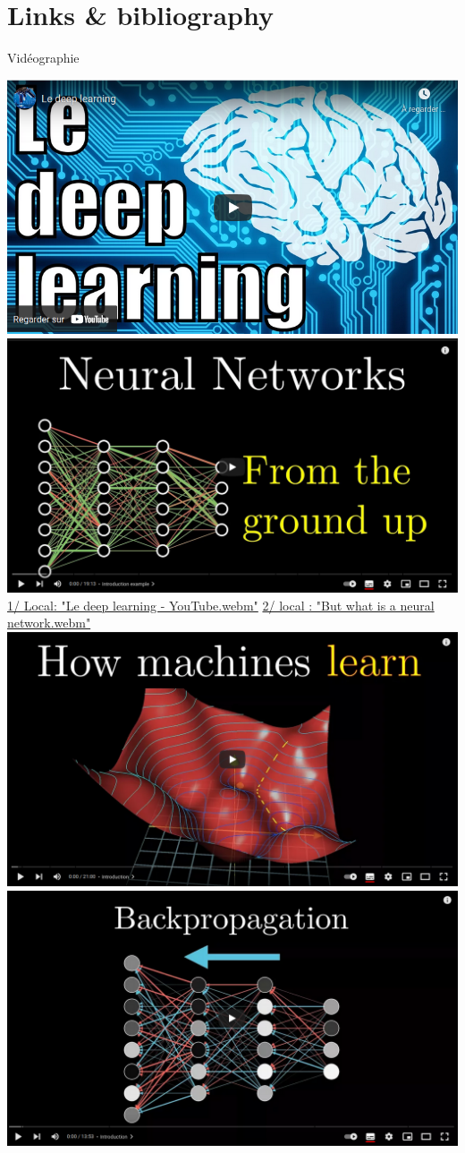 \documentclass[10pt,serif,mathserif,compress,hyperref={colorlinks}]{beamer}
\begin{document}
\section{Links \& bibliography}

\begin{frame}{Vidéographie}

  \hspace*{-3mm}
  \href{https://youtu.be/trWrEWfhTVg}{\includegraphics[width=.5\textwidth]{images/video-LeDeepLearning.png}}
  \hfill%
  \href{https://www.3blue1brown.com/lessons/neural-networks}{\includegraphics[width=.5\textwidth]{images/video-NeuralNetworks.png}}\\[-2mm]

  {\tiny\hspace*{-2mm}\href{run:./videos/Le deep learning - YouTube.webm}{1/ Local: "Le deep learning - YouTube.webm"}%
    \hfill%
    \href{run:./videos/But what is a neural network.webm}{2/ local : "But what is a neural network.webm"}}\\[2mm]
            
  \hspace*{-3mm}
  \href{https://www.3blue1brown.com/lessons/gradient-descent}{\includegraphics[width=.5\textwidth]{images/video-HowMachineLearn.png}}
  \hfill
  \href{https://www.3blue1brown.com/lessons/backpropagation}{\includegraphics[width=.5\textwidth]{images/video-BackPropagation.png}}\\[-2mm]
  

\end{frame}
\end{document}
